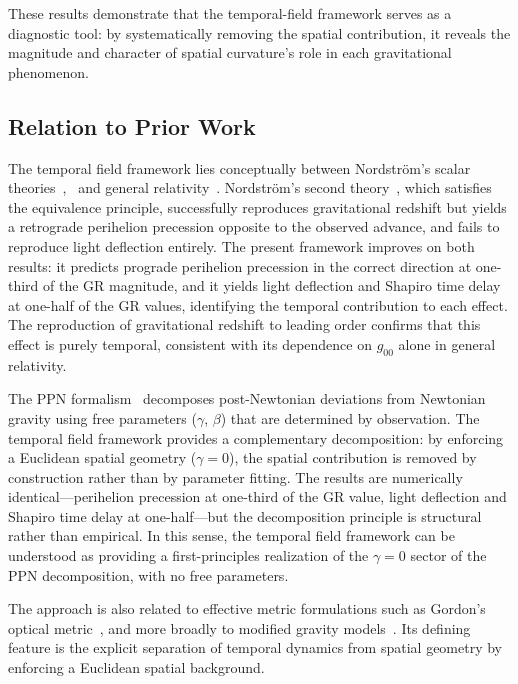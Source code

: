 \documentclass[12pt]{article}
\begin{document}
These results demonstrate that the temporal-field framework serves as a diagnostic tool: by systematically removing the spatial contribution, it reveals the magnitude and character of spatial curvature's role in each gravitational phenomenon.

\subsection{Relation to Prior Work}
\label{sec:prior_work}

The temporal field framework lies conceptually between Nordstr\"om's scalar theories~\cite{Nordstrom1912},~\cite{Nordstrom1913} and general relativity~\cite{Einstein1915}. Nordstr\"om's second theory~\cite{Nordstrom1913}, which satisfies the equivalence principle, successfully reproduces gravitational redshift but yields a retrograde perihelion precession opposite to the observed advance, and fails to reproduce light deflection entirely. The present framework improves on both results: it predicts prograde perihelion precession in the correct direction at one-third of the GR magnitude, and it yields light deflection and Shapiro time delay at one-half of the GR values, identifying the temporal contribution to each effect. The reproduction of gravitational redshift to leading order confirms that this effect is purely temporal, consistent with its dependence on $g_{00}$ alone in general relativity.

The PPN formalism~\cite{Will2014} decomposes post-Newtonian deviations from Newtonian gravity using free parameters ($\gamma$, $\beta$) that are determined by observation. The temporal field framework provides a complementary decomposition: by enforcing a Euclidean spatial geometry ($\gamma = 0$), the spatial contribution is removed by construction rather than by parameter fitting. The results are numerically identical---perihelion precession at one-third of the GR value, light deflection and Shapiro time delay at one-half---but the decomposition principle is structural rather than empirical. In this sense, the temporal field framework can be understood as providing a first-principles realization of the $\gamma = 0$ sector of the PPN decomposition, with no free parameters.

The approach is also related to effective metric formulations such as Gordon's optical metric~\cite{Gordon1923}, and more broadly to modified gravity models~\cite{Clifton2012}. Its defining feature is the explicit separation of temporal dynamics from spatial geometry by enforcing a Euclidean spatial background.
\end{document}
